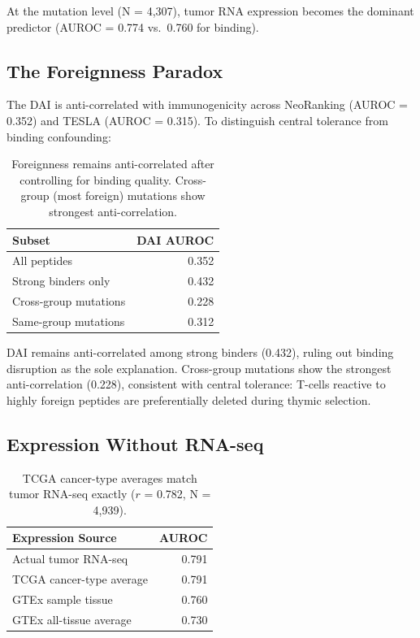 \documentclass[11pt,twocolumn]{article}
\begin{document}
At the mutation level (N = 4,307), tumor RNA expression becomes the dominant predictor (AUROC = 0.774 vs.\ 0.760 for binding).

\subsection{The Foreignness Paradox}

The DAI is anti-correlated with immunogenicity across NeoRanking (AUROC = 0.352) and TESLA (AUROC = 0.315). To distinguish central tolerance from binding confounding:

\begin{table}[ht]
\centering
\footnotesize
\begin{tabular}{@{}lr@{}}
\toprule
Subset & DAI AUROC \\
\midrule
All peptides & 0.352 \\
Strong binders only & 0.432 \\
Cross-group mutations & 0.228 \\
Same-group mutations & 0.312 \\
\bottomrule
\end{tabular}
\caption{Foreignness remains anti-correlated after controlling for binding quality. Cross-group (most foreign) mutations show strongest anti-correlation.}
\end{table}

DAI remains anti-correlated among strong binders (0.432), ruling out binding disruption as the sole explanation. Cross-group mutations show the strongest anti-correlation (0.228), consistent with central tolerance: T-cells reactive to highly foreign peptides are preferentially deleted during thymic selection.

\subsection{Expression Without RNA-seq}

\begin{table}[ht]
\centering
\footnotesize
\begin{tabular}{@{}lr@{}}
\toprule
Expression Source & AUROC \\
\midrule
Actual tumor RNA-seq & 0.791 \\
TCGA cancer-type average & 0.791 \\
GTEx sample tissue & 0.760 \\
GTEx all-tissue average & 0.730 \\
\bottomrule
\end{tabular}
\caption{TCGA cancer-type averages match tumor RNA-seq exactly ($r$ = 0.782, N = 4,939).}
\end{table}
\end{document}
